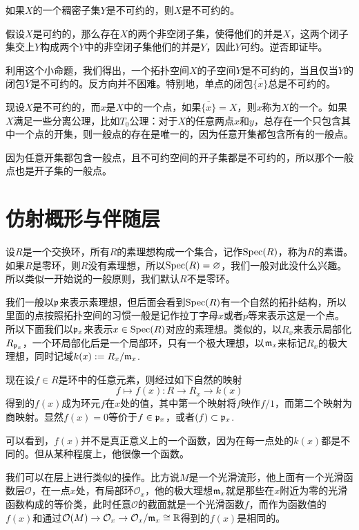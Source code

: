 \para 如果$X$的一个稠密子集$Y$是不可约的，则$X$是不可约的。

假设$X$是可约的，那么存在$X$的两个非空闭子集，使得他们的并是$X$，这两个闭子集交上$Y$构成两个$Y$中的非空闭子集他们的并是$Y$，因此$Y$可约。逆否即证毕。

利用这个小命题，我们得出，一个拓扑空间$X$的子空间$Y$是不可约的，当且仅当$Y$的闭包$\bar{Y}$是不可约的。反方向并不困难。特别地，单点的闭包$\overline{\{x\}}$总是不可约的。

\para 现设$X$是不可约的，而$x$是$X$中的一个点，如果$\overline{\{x\}}=X$，则$x$称为$X$的一个。如果$X$满足一些分离公理，比如$T_0$公理：对于$X$的任意两点$x$和$y$，总存在一个只包含其中一个点的开集，则一般点的存在是唯一的，因为任意开集都包含所有的一般点。

因为任意开集都包含一般点，且不可约空间的开子集都是不可约的，所以那个一般点也是开子集的一般点。

\section{仿射概形与伴随层}

\para 设$R$是一个交换环，所有$R$的素理想构成一个集合，记作$\operatorname{Spec}(R)$，称为$R$的素谱。如果$R$是零环，则$R$没有素理想，所以$\operatorname{Spec}(R)=\varnothing$，我们一般对此没什么兴趣。所以类似一开始说的一般原则，我们默认$R$不是零环。

我们一般以$\mathfrak{p}$来表示素理想，但后面会看到$\operatorname{Spec}(R)$有一个自然的拓扑结构，所以里面的点按照拓扑空间的习惯一般是记作拉丁字母$x$或者$p$等来表示这是一个点。所以下面我们以$\mathfrak{p}_x$来表示$x\in \operatorname{Spec}(R)$对应的素理想。类似的，以$R_x$来表示局部化$R_{\mathfrak{p}_x}$，一个环局部化后是一个局部环，只有一个极大理想，以$\mathfrak{m}_x$来标记$R_x$的极大理想，同时记域$k(x):=R_x/\mathfrak{m}_x$.

\para 现在设$f\in R$是环中的任意元素，则经过如下自然的映射
\[
	f\mapsto f(x):R\to R_x\to k(x)
\]
得到的$f(x)$成为环元$f$在$x$处的值，其中第一个映射将$f$映作$f/1$，而第二个映射为商映射。显然$f(x)=0$等价于$f\in \mathfrak{p}_x$，或者$(f)\subset \mathfrak{p}_x$.

可以看到，$f(x)$并不是真正意义上的一个函数，因为在每一点处的$k(x)$都是不同的。但从某种程度上，他很像一个函数。

我们可以在层上进行类似的操作。比方说$M$是一个光滑流形，他上面有一个光滑函数层$\mathcal{O}$，在一点$x$处，有局部环$\mathcal{O}_x$，他的极大理想$\mathfrak{m}_x$就是那些在$x$附近为零的光滑函数构成的等价类，此时任意$\mathcal{O}$的截面就是一个光滑函数$f$，而作为函数值的$f(x)$和通过$\mathcal{O}(M)\to \mathcal{O}_x\to \mathcal{O}_x/\mathfrak{m}_x\cong \mathbb{R}$得到的$f(x)$是相同的。

